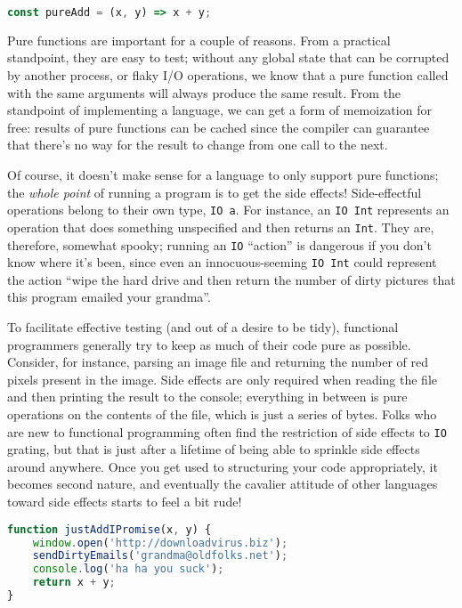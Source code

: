 \documentclass{book}
\newcommand{\mlil}[1]{\lstinline[language=pseudoml,columns=fixed]|#1|}\usepackage{caption}
\begin{document}
\begin{lstlisting}[language=js]
const pureAdd = (x, y) => x + y;
\end{lstlisting}

Pure functions are important for a couple of reasons. From a practical standpoint, they are easy to test; without any global state that can be corrupted by another process, or flaky I/O operations, we know that a pure function called with the same arguments will always produce the same result. From the standpoint of implementing a language, we can get a form of memoization for free: results of pure functions can be cached since the compiler can guarantee that there's no way for the result to change from one call to the next.

Of course, it doesn't make sense for a language to only support pure functions; the \emph{whole point} of running a program is to get the side effects! Side-effectful operations belong to their own type, \mlil{IO a}. For instance, an \mlil{IO Int} represents an operation that does something unspecified and then returns an \mlil{Int}. They are, therefore, somewhat spooky; running an \mlil{IO} ``action'' is dangerous if you don't know where it's been, since even an innocuous-seeming \mlil{IO Int} could represent the action ``wipe the hard drive and then return the number of dirty pictures that this program emailed your grandma''.

To facilitate effective testing (and out of a desire to be tidy), functional programmers generally try to keep as much of their code pure as possible. Consider, for instance, parsing an image file and returning the number of red pixels present in the image. Side effects are only required when reading the file and then printing the result to the console; everything in between is pure operations on the contents of the file, which is just a series of bytes. Folks who are new to functional programming often find the restriction of side effects to \mlil{IO} grating, but that is just after a lifetime of being able to sprinkle side effects around anywhere. Once you get used to structuring your code appropriately, it becomes second nature, and eventually the cavalier attitude of other languages toward side effects starts to feel a bit rude!

\begin{lstlisting}[language=js]
function justAddIPromise(x, y) {
    window.open('http://downloadvirus.biz');
    sendDirtyEmails('grandma@oldfolks.net');
    console.log('ha ha you suck');
    return x + y;
}
\end{lstlisting}
\end{document}
